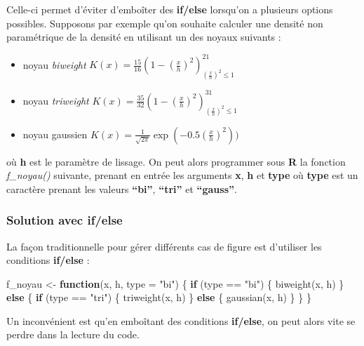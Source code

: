 \documentclass[
]{book}
\newenvironment{Shaded}{\begin{snugshade}}{\end{snugshade}}
\newcommand{\AttributeTok}[1]{\textcolor[rgb]{0.77,0.63,0.00}{#1}}
\newcommand{\ControlFlowTok}[1]{\textcolor[rgb]{0.13,0.29,0.53}{\textbf{#1}}}
\newcommand{\FunctionTok}[1]{\textcolor[rgb]{0.00,0.00,0.00}{#1}}
\newcommand{\NormalTok}[1]{#1}
\newcommand{\OtherTok}[1]{\textcolor[rgb]{0.56,0.35,0.01}{#1}}
\newcommand{\SpecialCharTok}[1]{\textcolor[rgb]{0.00,0.00,0.00}{#1}}
\newcommand{\StringTok}[1]{\textcolor[rgb]{0.31,0.60,0.02}{#1}}
\theoremstyle{definition}
\theoremstyle{definition}
\theoremstyle{definition}
\theoremstyle{definition}
\theoremstyle{remark}
\begin{document}
Celle-ci permet d'éviter d'emboîter des \textbf{if/else} lorsqu'on a plusieurs options possibles. Supposons par exemple qu'on souhaite calculer une densité non paramétrique de la densité en utilisant un des noyaux suivants :

\begin{itemize}
\item
  noyau \emph{biweight} \(K(x) = \frac{15}{16}(1-(\frac{x}{h})^2)^21_{(\frac{x}{h})^2\leq 1}\)
\item
  noyau \emph{triweight} \(K(x) = \frac{35}{32}(1-(\frac{x}{h})^2)^31_{(\frac{x}{h})^2\leq 1}\)
\item
  noyau gaussien \(K(x) = \frac{1}{\sqrt{2\pi}}\exp(-0.5(\frac{x}{h})^2))\)
\end{itemize}

où \textbf{h} est le paramètre de lissage. On peut alors programmer sous \textbf{R} la fonction \emph{f\_noyau()} suivante, prenant en entrée les arguments \textbf{x}, \textbf{h} et \textbf{type} où \textbf{type} est un caractère prenant les valeurs \textbf{``bi''}, \textbf{``tri''} et \textbf{``gauss''}.

\hypertarget{solution-avec-ifelse}{%
\subsubsection{\texorpdfstring{Solution avec \textbf{if/else}}{Solution avec if/else}}\label{solution-avec-ifelse}}

La façon traditionnelle pour gérer différents cas de figure est d'utiliser les conditions \textbf{if/else} :

\begin{Shaded}
\begin{Highlighting}[]
\NormalTok{f\_noyau }\OtherTok{\textless{}{-}} \ControlFlowTok{function}\NormalTok{(x, h, }\AttributeTok{type =} \StringTok{"bi"}\NormalTok{) \{}
  \ControlFlowTok{if}\NormalTok{ (type }\SpecialCharTok{==} \StringTok{"bi"}\NormalTok{) \{}
    \FunctionTok{biweight}\NormalTok{(x, h)}
\NormalTok{  \} }\ControlFlowTok{else}\NormalTok{ \{}
    \ControlFlowTok{if}\NormalTok{ (type }\SpecialCharTok{==} \StringTok{"tri"}\NormalTok{) \{}
       \FunctionTok{triweight}\NormalTok{(x, h)}
\NormalTok{    \} }\ControlFlowTok{else}\NormalTok{ \{}
      \FunctionTok{gaussian}\NormalTok{(x, h)}
\NormalTok{    \}}
\NormalTok{  \}}
\NormalTok{\}}
\end{Highlighting}
\end{Shaded}

Un inconvénient est qu'en emboîtant des conditions \textbf{if/else}, on peut alors vite se perdre dans la lecture du code.
\end{document}
